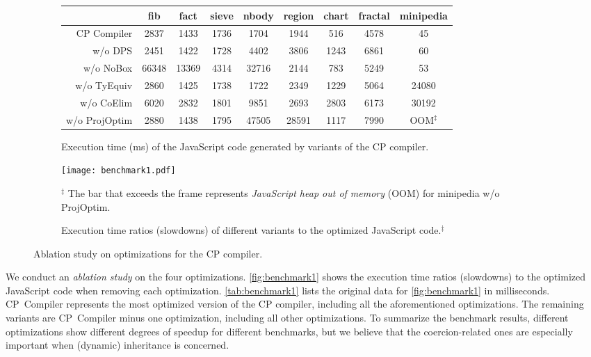 \begin{figure}
\begin{subfigure}{\textwidth}
\centering
\footnotesize
\begin{tabular}{r*{8}{c}}
& \sffamily fib & \sffamily fact & \sffamily sieve & \sffamily nbody & \sffamily region & \sffamily chart & \sffamily fractal & \sffamily minipedia \\
\toprule
\sffamily CP Compiler   &  2837 &  1433 & 1736 &  1704 &  1944 &  516 & 4578 &    45 \\
\sffamily w/o DPS       &  2451 &  1422 & 1728 &  4402 &  3806 & 1243 & 6861 &    60 \\
\sffamily w/o NoBox     & 66348 & 13369 & 4314 & 32716 &  2144 &  783 & 5249 &    53 \\
\sffamily w/o TyEquiv   &  2860 &  1425 & 1738 &  1722 &  2349 & 1229 & 5064 & 24080 \\
\sffamily w/o CoElim    &  6020 &  2832 & 1801 &  9851 &  2693 & 2803 & 6173 & 30192 \\
\sffamily w/o ProjOptim &  2880 &  1438 & 1795 & 47505 & 28591 & 1117 & 7990 & OOM$^\ddagger$ \\
\bottomrule
\end{tabular}
\caption{Execution time (ms) of the JavaScript code generated by variants of the CP compiler.} \label{tab:benchmark1}
\end{subfigure}
\begin{subfigure}{\textwidth}
\centering
\texttt{[image: benchmark1.pdf]}
\caption{Execution time ratios (slowdowns) of different variants to the optimized JavaScript code.$^\ddagger$}
\footnotesize $^\ddagger$
The bar that exceeds the frame represents \emph{JavaScript heap out of memory} (OOM) for \textsf{minipedia w/o ProjOptim}.
\label{fig:benchmark1}
\end{subfigure}
\caption{Ablation study on optimizations for the CP compiler.}
\end{figure}

\noindent
We conduct an \emph{ablation study} on the four optimizations.
\autoref{fig:benchmark1} shows the execution time ratios (slowdowns) to the
optimized JavaScript code when removing each optimization.
\autoref{tab:benchmark1} lists the original data for \autoref{fig:benchmark1} in
milliseconds. \textsf{CP~Compiler} represents the most optimized version of the
CP compiler, including all the aforementioned optimizations. The remaining
variants are \textsf{CP~Compiler} minus one optimization, including all other
optimizations. To summarize the benchmark results, different optimizations show
different degrees of speedup for different benchmarks, but we believe that the
coercion-related ones are especially important when (dynamic) inheritance is
concerned.

